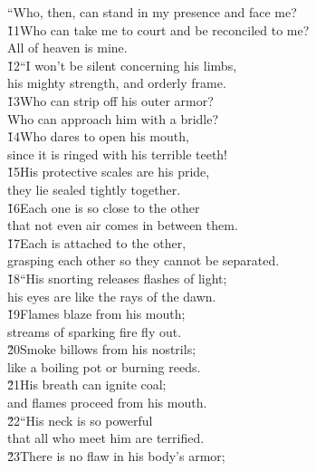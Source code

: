 \begin{poetry}
\poeml ``Who, then, can stand in my presence and face me? \\
\poeml \v{11}Who can take me to court and be reconciled to me? \\
\poemlll       All of heaven is mine. \\
\poeml \v{12}``I won't be silent concerning his limbs, \\
\poemll    his mighty strength, and orderly frame. \\
\poeml \v{13}Who can strip off his outer armor? \\
\poemll    Who can approach him with a bridle? \\
\poeml \v{14}Who dares to open his mouth, \\
\poemll    since it is ringed with his terrible teeth! \\
\poeml \v{15}His protective scales are his pride, \\
\poemll    they lie sealed tightly together. \\
\poeml \v{16}Each one is so close to the other \\
\poemll    that not even air comes in between them. \\
\poeml \v{17}Each is attached to the other, \\
\poemll    grasping each other so they cannot be separated. \\
\poeml \v{18}``His snorting releases flashes of light; \\
\poemll    his eyes are like the rays of the dawn. \\
\poeml \v{19}Flames blaze from his mouth; \\
\poemll    streams of sparking fire fly out. \\
\poeml \v{20}Smoke billows from his nostrils; \\
\poemll    like a boiling pot or burning reeds. \\
\poeml \v{21}His breath can ignite coal; \\
\poemll    and flames proceed from his mouth. \\
\poeml \v{22}``His neck is so powerful \\
\poemll    that all who meet him are terrified. \\
\poeml \v{23}There is no flaw in his body's armor; \\

\end{poetry}
